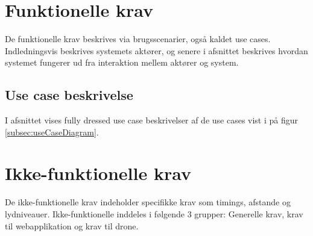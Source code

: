 \chapter{Funktionelle krav}

\label{sec:funkKrav}
De funktionelle krav beskrives via brugsscenarier, også kaldet use cases. Indledningsvis beskrives systemets aktører, og senere i afsnittet beskrives hvordan systemet fungerer ud fra interaktion mellem aktører og system.

			



\newpage
\section{Use case beskrivelse}
\label{subsec:useCaseBeskrivelse}
I afsnittet vises fully dressed use case beskrivelser af de use cases vist i på figur \ref{subsec:useCaseDiagram}. \newline 








\newpage
\chapter{Ikke-funktionelle krav}
\label{sec:ikkeFunkKrav}
De ikke-funktionelle krav indeholder specifikke krav som timings, afstande og lydniveauer.
Ikke-funktionelle inddeles i følgende 3 grupper: Generelle krav, krav til webapplikation og krav til drone.\newline


